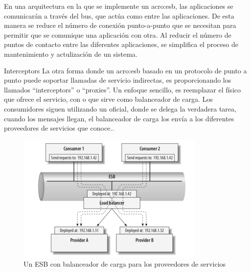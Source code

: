 
En una arquitectura en la que se implemente un \gls{acro:esb}, las aplicaciones se comunicarán a través del bus, que actúa como  entre las aplicaciones. De esta manera se reduce el número de conexión punto-a-punto que se necesitan para permitir que se comunique una aplicación con otra.  Al reducir el número de puntos de contacto entre las diferentes aplicaciones, se simplifica el proceso de mantenimiento y actulización de un sistema.


Interceptors
La otra forma donde un \gls{acro:esb} basado en un protocolo de punto a punto puede soportar llamadas de servicio indirectas, es proporcionando los llamados ``interceptors'' o ``proxies''. Un enfoque sencillo, es reemplazar el  físico que ofrece el servicio, con  o  que sirve como balanceador de carga. Los consumidores siguen utilizando un  oficial, donde se delega la verdadera tarea, cuando los mensajes llegan, el balanceador de carga los envía a los diferentes proveedores de servicios que conoce.\cite[p.~52]{josuttis2007}.

\begin{figure}[H]
  \includegraphics[width=\linewidth]{src/images/03-capitulo-3/tecnologias/esb/esb-interceptors-load-balancer.png}
  \caption{Un ESB con balanceador de carga para los proveedores de servicios}
  \label{fig:esb-interceptors-load-balancer}
\end{figure}

